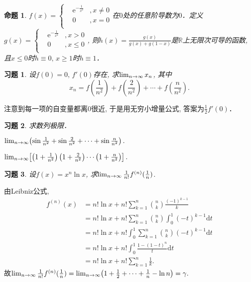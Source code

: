 \documentclass[11pt,a4paper]{ctexart}
\makeatletter
\theoremstyle{thmseries} %
\newtheorem{prop}{命题}[section]
\theoremstyle{exerseries}
\newtheorem{exer}{习题}[section]
\renewenvironment{proof}[1][\proofname]{\par
  \pushQED{\qed}%
  \normalfont \topsep6\p@\@plus6\p@\relax
  \trivlist
  \item[\hskip\labelsep
        \itshape
    #1\@addpunct{}]\ignorespaces
}{%
  \popQED\endtrivlist\@endpefalse
}
\newenvironment{sol}{\begin{proof}[\bfseries\upshape 解\quad]}{\end{proof}}
\newcommand{\bra}[1]{\mathopen{}\left(#1\right)}
\newcommand{\sbra}[1]{\mathopen{}\left[#1\right]}
\newcommand{\R}{\mathbb{R}}
\renewcommand{\d}{\mathrm{d}}
\newcommand{\e}{\mathrm{e}}
\def \nti {\mathnormal{n}\to\infty}
\makeatother
\begin{document}
\begin{prop}
	$f(x)=\left\{\begin{aligned}
		&\e^{-\frac{1}{x^2}}&,x\neq0\\
		&0&,x=0\\
	\end{aligned}\right.$在$0$处的任意阶导数为$0$．定义$g(x)=\left\{\begin{aligned}
		&\e^{-\frac{1}{x^2}}&,x>0\\
		&0&,x\leq0\\
	\end{aligned}\right.$, 则$h(x)=\frac{g(x)}{g(x)+g(1-x)}$是$\R$上无限次可导的函数, 且$x\leq0$时$h\equiv0,\,x\geq1$时$h\equiv1$．
\end{prop}

\begin{exer}
	设$f(0)=0,\,f'(0)$存在, 求$\lim_{\nti}x_n$, 其中
	\[x_n=f\bra{\frac{1}{n^2}}+f\bra{\frac{2}{n^2}}+\cdots+f\bra{\frac{n}{n^2}}.\]
\end{exer}
\begin{sol}
	注意到每一项的自变量都离$0$很近, 于是用无穷小增量公式, 答案为$\frac{1}{2}f'(0)$．
\end{sol}

\begin{exer}
	求数列极限．
	\begin{enumerate}
	\end{enumerate}
\end{exer}

\begin{exer}
	设$f(x)=x^n\ln x$, 求$\lim_{\nti}\frac{1}{n!}f^{(n)}(\frac{1}{n})$.
\end{exer}
\begin{sol}
	由Leibniz公式,
	\begin{align*}
		f^{(n)}(x)&=n!\ln x+n!\sum_{k=1}^{n}\binom{n}{k}\frac{(-1)^{k-1}}{k}\\
		&=n!\ln x+n!\sum_{k=1}^{n}\binom{n}{k}\int_{0}^{1}(-t)^{k-1}\d t\\
		&=n!\ln x+n!\int_{0}^{1}\sum_{k=1}^{n}\binom{n}{k}(-t)^{k-1}\d t\\
		&=n!\ln x+n!\int_{0}^{1}\frac{1-(1-t)^n}{t}\d t\\
		&=n!\ln x+n!\sum_{k=1}^{n}\frac{1}{k}.
	\end{align*}
	故$\lim_{\nti}\frac{1}{n!}f^{(n)}(\frac{1}{n})=\lim_{\nti}\bra{1+\frac{1}{2}+\cdots+\frac{1}{n}-\ln n}=\gamma.$
\end{sol}
\end{document}
